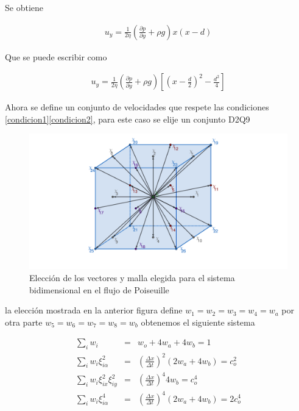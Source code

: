 \noindent Se obtiene 

\begin{eqnarray*}
u_{y} = \frac{1}{2\eta}\left(\frac{\partial p}{\partial y} + \rho g\right)x(x-d)
\end{eqnarray*}

\noindent Que se puede escribir como 

\begin{eqnarray}
\label{TeoricaPoiseuille}
\boxed{u_{y} = \frac{1}{2\eta}\left(\frac{\partial p}{\partial y} + \rho g\right)\left[\left(x-\frac{d}{2}\right)^{2} - \frac{d^{2}}{4}\right]}
\end{eqnarray}


Ahora se define un conjunto de velocidades que respete las condiciones \eqref{condicion1}\eqref{condicion2}, para este caso se elije un conjunto D2Q9

\begin{figure}[H]
\centering
\includegraphics[scale = 0.3]{D3Q19.pdf}
\caption{Elección de los vectores y malla elegida para el sistema bidimensional en el flujo de Poiseuille }
\label{Poiseuille_100}
\end{figure}

la elección mostrada en la anterior figura define $w_{1}=w_{2}=w_{3}=w_{4}=w_{a}$ por otra parte $w_{5}=w_{6}=w_{7}=w_{8}=w_{b}$ obtenemos el siguiente sistema 

\begin{eqnarray}
\sum_{i}w_{i} &=& w_{o}+4w_{a}+4w_{b} = 1\\
\sum_{i}w_{i}\xi^{2}_{i\alpha}&=&\left(\frac{\Delta x}{\Delta t}\right)^{2}(2w_{a}+4w_{b})=c_{o}^{2}\\
\sum_{i}w_{i}\xi_{ix}^{2}\xi_{iy}^{2}&=&\left(\frac{\Delta x}{\Delta t}\right)^{4}4w_{b} = c_{o}^{4}\\
\sum_{i}w_{i}\xi_{i\alpha}^{4} &=& \left(\frac{\Delta x}{\Delta t}\right)^{4}(2w_{a}+4w_{b})=2c_{o}^{4}
\end{eqnarray}

